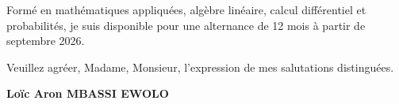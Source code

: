 \documentclass[a4paper,11pt]{article}
\begin{document}
\vspace{0.8em}

Form\'e en math\'ematiques appliqu\'ees, alg\`ebre lin\'eaire, calcul diff\'erentiel et probabilit\'es, je suis disponible pour une alternance de 12 mois \`a partir de septembre 2026.

\vspace{1.5em}
\noindent Veuillez agr\'eer, Madame, Monsieur, l'expression de mes salutations distingu\'ees.

\vspace{2em}
\noindent \textbf{Lo\"ic Aron MBASSI EWOLO}
\end{document}
